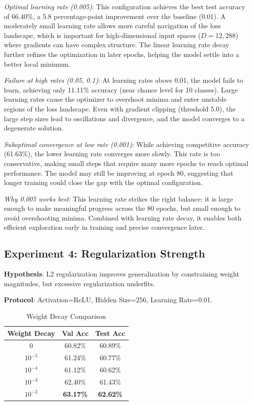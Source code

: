 \documentclass[sigconf,nonacm]{acmart}
\begin{document}
\textit{Optimal learning rate (0.005)}: This configuration achieves the best test accuracy of 66.40\%, a 5.8 percentage-point improvement over the baseline (0.01). A moderately small learning rate allows more careful navigation of the loss landscape, which is important for high-dimensional input spaces ($D=12,288$) where gradients can have complex structure. The linear learning rate decay further refines the optimization in later epochs, helping the model settle into a better local minimum.

\textit{Failure at high rates (0.05, 0.1)}: At learning rates above 0.01, the model fails to learn, achieving only 11.11\% accuracy (near chance level for 10 classes). Large learning rates cause the optimizer to overshoot minima and enter unstable regions of the loss landscape. Even with gradient clipping (threshold 5.0), the large step sizes lead to oscillations and divergence, and the model converges to a degenerate solution.

\textit{Suboptimal convergence at low rate (0.001)}: While achieving competitive accuracy (61.63\%), the lower learning rate converges more slowly. This rate is too conservative, making small steps that require many more epochs to reach optimal performance. The model may still be improving at epoch 80, suggesting that longer training could close the gap with the optimal configuration.

\textit{Why 0.005 works best}: This learning rate strikes the right balance: it is large enough to make meaningful progress across the 80 epochs, but small enough to avoid overshooting minima. Combined with learning rate decay, it enables both efficient exploration early in training and precise convergence later.

\subsection{Experiment 4: Regularization Strength}

\textbf{Hypothesis}: L2 regularization improves generalization by constraining weight magnitudes, but excessive regularization underfits.

\textbf{Protocol}: Activation=ReLU, Hidden Size=256, Learning Rate=0.01.

\begin{table}[htbp]
\caption{Weight Decay Comparison}
\label{tab:wd}
\centering
\small
\begin{tabular}{ccc}
\toprule
Weight Decay & Val Acc & Test Acc \\
\midrule
0 & 60.82\% & 60.89\% \\
$10^{-5}$ & 61.24\% & 60.77\% \\
$10^{-4}$ & 61.12\% & 60.62\% \\
$10^{-3}$ & 62.40\% & 61.43\% \\
\textbf{$10^{-2}$} & \textbf{63.17\%} & \textbf{62.62\%} \\
\bottomrule
\end{tabular}
\end{table}
\end{document}
